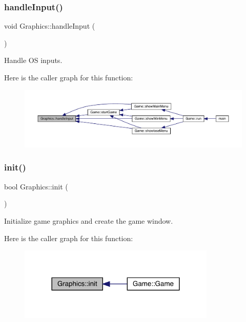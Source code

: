 \subsubsection{\texorpdfstring{handle\+Input()}{handleInput()}}
{\footnotesize\ttfamily void Graphics\+::handle\+Input (\begin{DoxyParamCaption}{ }\end{DoxyParamCaption})}



Handle OS inputs. 

Here is the caller graph for this function\+:
\nopagebreak
\begin{figure}[H]
\begin{center}
\leavevmode
\includegraphics[width=350pt]{class_graphics_adff993cdcd0ed498c82cf7be87ead4f1_icgraph}
\end{center}
\end{figure}
\mbox{\label{class_graphics_a64b5764b2dbef1b6df23ce18b1a918a1}} 
\subsubsection{\texorpdfstring{init()}{init()}}
{\footnotesize\ttfamily bool Graphics\+::init (\begin{DoxyParamCaption}{ }\end{DoxyParamCaption})}



Initialize game graphics and create the game window. 

Here is the caller graph for this function\+:\nopagebreak
\begin{figure}[H]
\begin{center}
\leavevmode
\includegraphics[width=266pt]{class_graphics_a64b5764b2dbef1b6df23ce18b1a918a1_icgraph}
\end{center}
\end{figure}
\mbox{\label{class_graphics_ad6339f656cf977c3a0cdd8688c672125}} 
